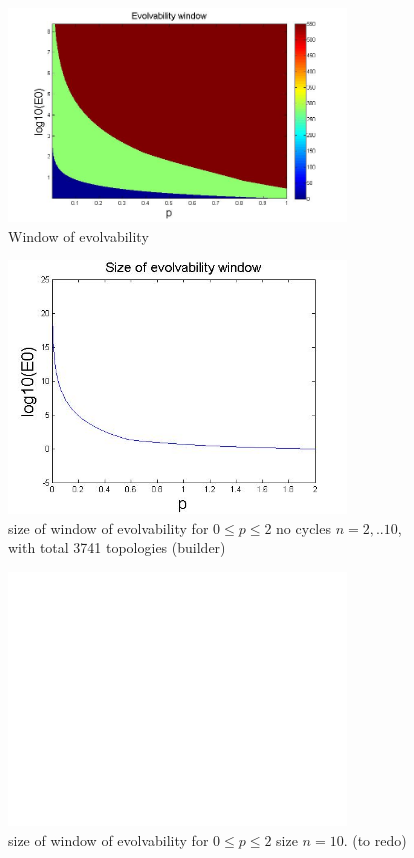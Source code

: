\documentclass{amsart}
\theoremstyle{plain}
\numberwithin{equation}{section}
\begin{document}
\begin{figure}[p]
    \centering
    \includegraphics[width=0.8\textwidth]{evowind.jpg}
    \caption{Window of evolvability}
    \label{fig8}
\end{figure}

\begin{figure}[p]
    \centering
    \includegraphics[width=0.8\textwidth]{sizeevo.jpg}
    \caption{size of window of evolvability for $0\leq p\leq 2$ no cycles $n=2,..10$, with total 3741 topologies (builder)}
    \label{fig9}
\end{figure}

\begin{figure}[p]
    \centering
    \includegraphics[width=0.8\textwidth]{untitled.jpg}
    \caption{size of window of evolvability for $0\leq p\leq 2$ size $n=10$. (to redo)}
    \label{fig10}
\end{figure}
\end{document}
